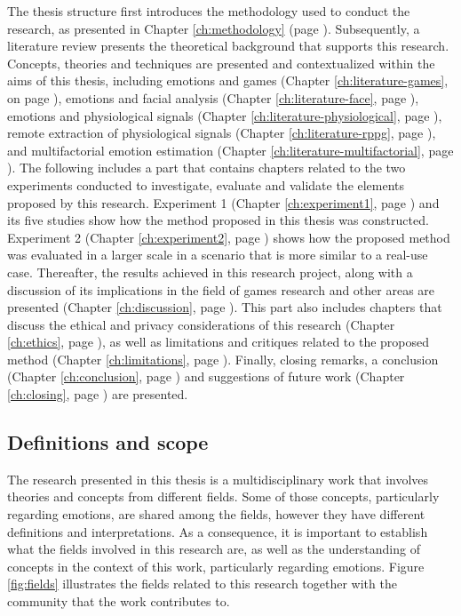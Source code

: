 The thesis structure first introduces the methodology used to conduct the research, as presented in Chapter \ref{ch:methodology} (page \pageref{ch:methodology}). Subsequently, a literature review presents the theoretical background that supports this research. Concepts, theories and techniques are presented and contextualized within the aims of this thesis, including emotions and games (Chapter \ref{ch:literature-games}, on page \pageref{ch:literature-games}), emotions and facial analysis (Chapter \ref{ch:literature-face}, page \pageref{ch:literature-face}), emotions and physiological signals (Chapter \ref{ch:literature-physiological}, page \pageref{ch:literature-physiological}), remote extraction of physiological signals (Chapter \ref{ch:literature-rppg}, page \pageref{ch:literature-rppg}), and multifactorial emotion estimation (Chapter \ref{ch:literature-multifactorial}, page \pageref{ch:literature-multifactorial}). The following includes a part that contains chapters related to the two experiments conducted to investigate, evaluate and validate the elements proposed by this research. Experiment 1 (Chapter \ref{ch:experiment1}, page \pageref{ch:experiment1}) and its five studies show how the method proposed in this thesis was constructed. Experiment 2 (Chapter \ref{ch:experiment2}, page \pageref{ch:experiment2}) shows how the proposed method was evaluated in a larger scale in a scenario that is more similar to a real-use case. Thereafter, the results achieved in this research project, along with a discussion of its implications in the field of games research and other areas are presented (Chapter \ref{ch:discussion}, page \pageref{ch:discussion}). This part also includes chapters that discuss the ethical and privacy considerations of this research (Chapter \ref{ch:ethics}, page \pageref{ch:ethics}), as well as limitations and critiques related to the proposed method (Chapter \ref{ch:limitations}, page \pageref{ch:limitations}). Finally, closing remarks, a conclusion (Chapter \ref{ch:conclusion}, page \pageref{ch:conclusion}) and suggestions of future work (Chapter \ref{ch:closing}, page \pageref{ch:closing}) are presented.

\subsection{Definitions and scope}

The research presented in this thesis is a multidisciplinary work that involves theories and concepts from different fields. Some of those concepts, particularly regarding emotions, are shared among the fields, however they have different definitions and interpretations. As a consequence, it is important to establish what the fields involved in this research are, as well as the understanding of concepts in the context of this work, particularly regarding emotions. Figure \ref{fig:fields} illustrates the fields related to this research together with the community that the work contributes to.

